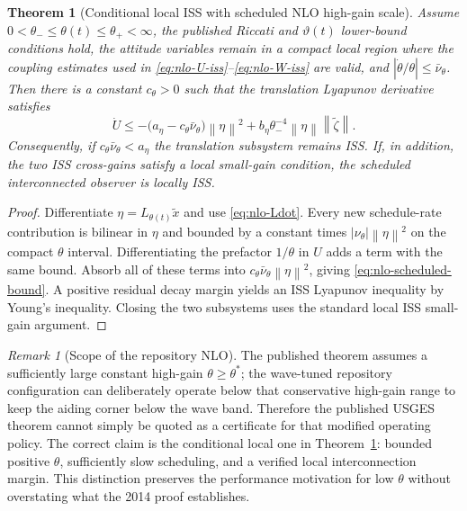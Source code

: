 \documentclass[conference]{IEEEtran}
\newcommand{\norm}[1]{\left\lVert#1\right\rVert}
\newcommand{\abs}[1]{\left|#1\right|}
\newtheorem{theorem}{Theorem}
\theoremstyle{remark}
\newtheorem{remark}{Remark}
\begin{document}
\begin{theorem}[Conditional local ISS with scheduled NLO high-gain scale]
\label{thm:nlo-scheduled}
Assume $0<\theta_-\le\theta(t)\le\theta_+<\infty$, the published Riccati and
$\vartheta(t)$ lower-bound conditions hold, the attitude variables remain in a
compact local region where the coupling estimates used in
\eqref{eq:nlo-U-iss}--\eqref{eq:nlo-W-iss} are valid, and
$\abs{\dot\theta/\theta}\le\bar\nu_\theta$.  Then there is a constant
$c_\theta>0$ such that the translation Lyapunov derivative satisfies
\begin{equation}
 \dot U
 \le-\bigl(a_\eta-c_\theta\bar\nu_\theta\bigr)\norm\eta^2
 +b_\eta\theta_-^{-4}\norm\eta\norm{\tilde\zeta}.
 \label{eq:nlo-scheduled-bound}
\end{equation}
Consequently, if $c_\theta\bar\nu_\theta<a_\eta$ the translation subsystem
remains ISS.  If, in addition, the two ISS cross-gains satisfy a local small-gain
condition, the scheduled interconnected observer is locally ISS.
\end{theorem}

\begin{proof}
Differentiate $\eta=L_{\theta(t)}\tilde x$ and use
\eqref{eq:nlo-Ldot}.  Every new schedule-rate contribution is bilinear in
$\eta$ and bounded by a constant times
$\abs{\nu_\theta}\norm\eta^2$ on the compact $\theta$ interval.  Differentiating
the prefactor $1/\theta$ in $U$ adds a term with the same bound.  Absorb all of
these terms into $c_\theta\bar\nu_\theta\norm\eta^2$, giving
\eqref{eq:nlo-scheduled-bound}.  A positive residual decay margin yields an ISS
Lyapunov inequality by Young's inequality.  Closing the two subsystems uses the
standard local ISS small-gain argument.
\end{proof}

\begin{remark}[Scope of the repository NLO]
The published theorem assumes a sufficiently large constant high-gain
$\theta\ge\theta^*$; the wave-tuned repository configuration can deliberately
operate below that conservative high-gain range to keep the aiding corner below
the wave band.  Therefore the published USGES theorem cannot simply be quoted
as a certificate for that modified operating policy.  The correct claim is the
conditional local one in Theorem~\ref{thm:nlo-scheduled}: bounded positive
$\theta$, sufficiently slow scheduling, and a verified local interconnection
margin.  This distinction preserves the performance motivation for low
$\theta$ without overstating what the 2014 proof establishes.
\end{remark}
\end{document}
